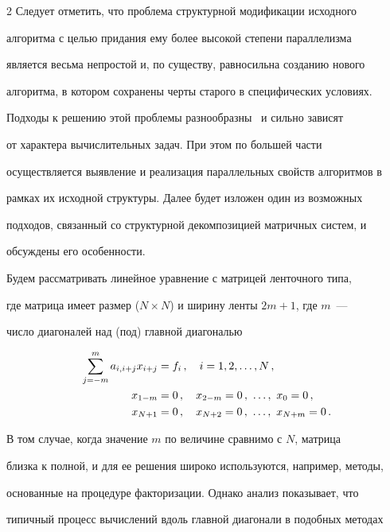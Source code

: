 \begin{multicols}{2}
     Следует отметить, что проблема структурной модификации исходного


алгоритма с целью придания ему более высокой степени параллелизма


является весьма непростой и, по существу, равносильна созданию нового


алгоритма, в котором сохранены черты старого в специфических условиях.


Подходы к решению этой проблемы разнообразны~\cite{3ol} и сильно зависят


от характера вычислительных задач. При этом по большей части


осуществляется выявление и реализация параллельных свойств алгоритмов в


рамках их исходной структуры. Далее будет изложен один из возможных


подходов, связанный со структурной декомпозицией матричных систем, и


обсуждены его особенности.





     Будем рассматривать линейное уравнение с мат\-ри\-цей ленточного типа,


где матрица имеет размер ($N\times N$) и ширину ленты $2m + 1$, где $m$~---


число диагоналей над (под) главной диагональю


     \begin{align}


     \sum\limits_{j=-m}^m a_{i,i+j}x_{i+j} & = f_i\,,\quad i=1, 2, \ldots , N\,,


     \label{e1ol}\\


     x_{1-m} & =0\,,\quad x_{2-m} =0\,,\ \ldots ,\  x_0 =0\,,\notag\\


     x_{N+1} & = 0\,, \quad x_{N+2} =0\,,\ \ldots ,\  x_{N+m}=0\,.\notag


     \end{align}





     В том случае, когда значение $m$ по величине сравнимо с $N$, матрица


близка к полной, и для ее решения широко используются, например, методы,


основанные на процедуре факторизации. Однако анализ показывает, что


типичный процесс вы\-чис\-ле\-ний вдоль главной диагонали в подобных методах



\end{multicols}

